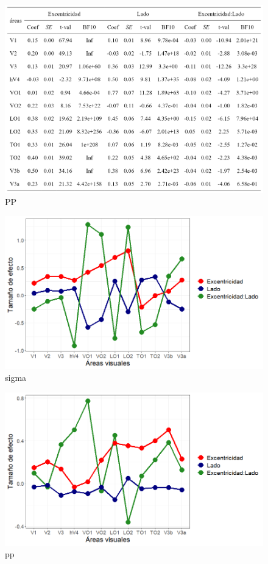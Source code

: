 \begin{figure}
	\centering		
	\includegraphics[scale=0.8]{Graphics/table5}
	\caption{PP}
\end{figure}

\begin{figure}
	\centering		
	\includegraphics[scale=0.6]{../images/effect_size_eccen_all_rois}
	\caption{sigma}
\end{figure}
\begin{figure}
	\centering		
	\includegraphics[scale=0.6]{Graphics/effect_size_rois_2}
	\caption{pp}
\end{figure}



